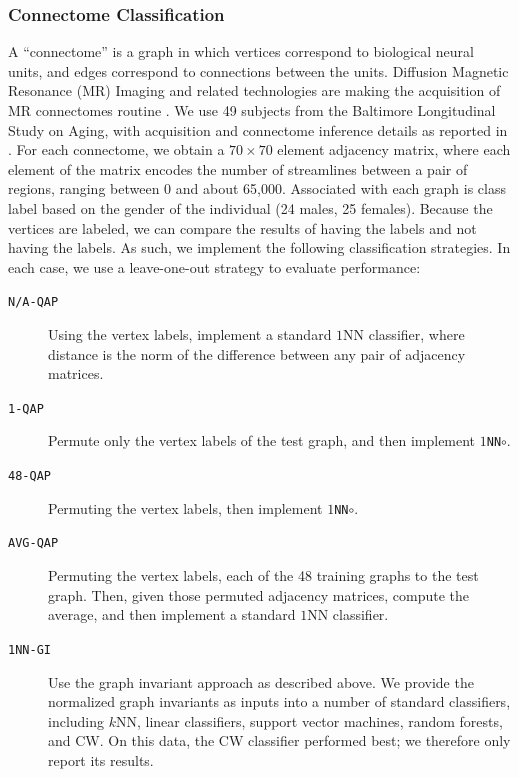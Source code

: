 \documentclass[10pt,journal,cspaper,compsoc]{IEEEtran}
\begin{document}




\subsubsection{Connectome Classification} %
\label{sub:connectome_classification}

A ``connectome'' is a graph in which vertices correspond to biological neural units, and edges correspond to connections between the units.  Diffusion Magnetic Resonance (MR) Imaging and related technologies are making the acquisition of MR connectomes routine \cite{Hagmann2010}.  We use 49 subjects from the Baltimore Longitudinal Study on Aging, with acquisition and connectome inference details as reported in \cite{OHBM10}.  For each connectome, we obtain a $70 \times 70$ element adjacency matrix, where each element of the matrix encodes the number of streamlines between a pair of regions, ranging between 0 and about 65,000.  Associated with each graph is class label based on the gender of the individual (24 males, 25 females).  Because the vertices are labeled, we can compare the results of having the labels and not having the labels.  As such, we implement the following classification strategies.  In each case, we use a leave-one-out strategy to evaluate performance:

\begin{description}
	\item[\texttt{N/A-QAP}] Using the vertex labels, implement a standard $1$NN classifier, where distance is the norm of the difference between any pair of adjacency matrices.
	\item[\texttt{1-QAP}] Permute only the vertex labels of the test graph, and then implement \texttt{$1$NN$\circ$\qapa}.
	\item[\texttt{48-QAP}] Permuting the vertex labels, then implement \texttt{$1$NN$\circ$\qapa}.
	\item[\texttt{AVG-QAP}] Permuting the vertex labels, \qapa each of the 48 training graphs to the test graph.  Then, given those permuted adjacency matrices, compute the average, and then implement a standard $1$NN classifier.
	\item[\texttt{1NN-GI}] Use the graph invariant approach as described above. We provide the normalized graph invariants as inputs into a number of standard classifiers, including $k$NN, linear classifiers, support vector machines, random forests, and CW. On this data, the CW classifier performed best; we therefore only report its results.
\end{description}
\end{document}

